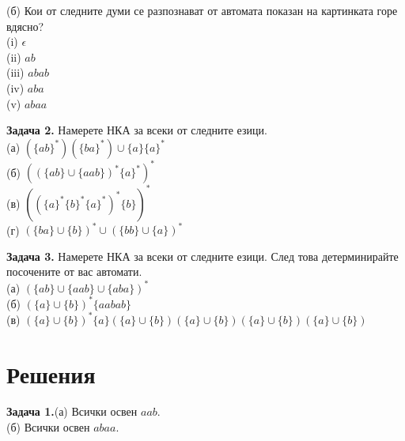 \documentclass{article}
\begin{document}
   \vspace{10pt}

   (б) Кои от следните думи се разпознават от автомата показан на картинката горе вдясно? \\
   (i) $\epsilon$ \\
   (ii) $ab$ \\
   (iii) $abab$ \\
   (iv) $aba$ \\
   (v) $abaa$ \\
    
   \vspace{35pt}

   \textbf{Задача 2.} Намерете НКА за всеки от следните езици. \\
   (а) $(\{ab\}^*)(\{ba\}^*)\cup\{a\}\{a\}^*$ \\
   (б) $((\{ab\} \cup \{aab\})^*\{a\}^*)^*$ \\
   (в) $((\{a\}^*\{b\}^*\{a\}^*)^*\{b\})^*$ \\ 
   (г) $(\{ba\} \cup \{b\})^* \cup (\{bb\} \cup \{a\})^*$ 

   \vspace{15pt}
   
   \textbf{Задача 3.} Намерете НКА за всеки от следните езици. След това детерминирайте
   посочените от вас автомати. \\
   (а) $(\{ab\}\cup\{aab\}\cup\{aba\})^*$ \\
   (б) $(\{a\}\cup\{b\})^*\{aabab\}$ \\
   (в) $(\{a\}\cup\{b\})^*\{a\}(\{a\}\cup\{b\})(\{a\}\cup\{b\})(\{a\}\cup\{b\})(\{a\}\cup\{b\})$
\vspace{25pt}

\section{Решения}
  \textbf{Задача 1.}(а) Всички освен $aab$. \\
  (б) Всички освен $abaa$.

  \vspace{15pt}
\end{document}
